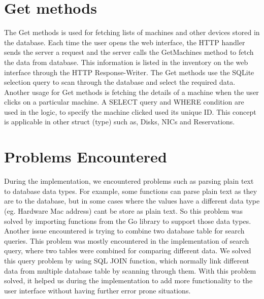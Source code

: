\section{Get methods}
The Get methods is used for fetching lists of machines and other devices stored in the database. Each time the user opens the web interface, the HTTP handler sends the server a request and the server calls the GetMachines method to fetch the data from database. This information is listed in the inventory on the web interface through the HTTP Response-Writer. The Get methods use the SQLite selection query to scan through the database and select the required data.  Another usage for Get methods is fetching the details of a machine when the user clicks on a particular machine. A SELECT query and WHERE condition are used in the logic, to specify the machine clicked used its unique ID. This concept is applicable in other struct (type) such as, Disks, NICs and Reservations. 
 
\section{Problems Encountered}
During the implementation, we encountered problems such as parsing plain text to database data types. For example, some functions can parse plain text as they are to the database, but in some cases where the values have a different data type (eg. Hardware Mac address) cant be store as plain text. So this problem was solved by importing functions from the Go library to support those data types. Another issue encountered is trying to combine two database table for search queries. This problem was mostly encountered in the implementation of search query, where two tables were combined for comparing different data.  We solved this query problem by using SQL JOIN function, which normally link different data from multiple database table by scanning through them. With this problem solved, it helped us during the implementation to add more functionality to the user interface without having further error prone situations.



